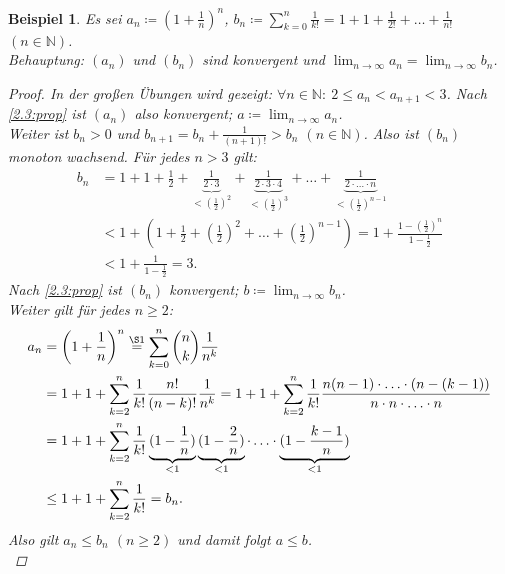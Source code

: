 \documentclass[12pt]{extreport} %
\newcommand{\N}{\mathbb{N}}
\theoremstyle{named}
\theoremstyle{itshape}
\theoremstyle{normal}
\newtheorem{beispiel}[unnamedtheorem]{Beispiel}
\begin{document}
\begin{beispiel} \label{2.9:bsp}
	Es sei $a_{n} \coloneqq \left( 1 + \frac{1}{n} \right)^{n}$, $b_{n} \coloneqq \sum_{k = 0}^{n} \frac{1}{k!} = 1 + 1 + \frac{1}{2!} + \dotsc + \frac{1}{n!}$ $(n \in \N)$.\\
	Behauptung: $(a_{n})$ und $(b_{n})$ sind konvergent und $\lim_{n \to \infty} a_{n} = \lim_{n \to \infty}  b_{n}$.
	
	\begin{proof}
		In der großen Übungen wird gezeigt: $\forall n \in \N: ~ 2 \leq a_{n} < a_{n+1} < 3$. Nach \ref{2.3:prop} ist $(a_n)$ also konvergent; 
		$a \coloneqq \lim_{n \to \infty} a_{n}$. \\
		Weiter ist $b_{n} > 0$ und $b_{n+1} = b_{n} + \frac{1}{(n+1)!} > b_{n}$ $(n \in \N)$. Also ist $(b_{n})$ monoton wachsend. Für jedes $n > 3$ gilt:
		\begin{align*} 
			b_{n} & = 1 + 1 + \frac{1}{2} + \underbrace{\frac{1}{2 \cdot 3}}_{< \left(\frac{1}{2}\right)^{2}} + \underbrace{\frac{1}{2 \cdot 3 \cdot 4}}_{< 
			\left(\frac{1}{2}\right)^{3}} + \dotsc + \underbrace{\frac{1}{2 \cdot \dotsc \cdot n}}_{< \left(\frac{1}{2}\right)^{n-1}} \\
			& < 1 + \left( 1 + \frac{1}{2} + \left(\frac{1}{2}\right)^{2} + \dotsc + \left(\frac{1}{2}\right)^{n-1} \right) 
			= 1 + \frac{1 - \left( \frac{1}{2} \right)^{n}}{1 - \frac{1}{2}} \\
			& < 1 + \frac{1}{1 - \frac{1}{2}} = 3.
		\end{align*} 
		Nach \ref{2.3:prop} ist $(b_{n})$ konvergent; $b \coloneqq \lim_{n \to \infty} b_{n}$. \\
		Weiter gilt für jedes $n \geq 2$:
		\begin{align*}
			a_{n} & = \left( 1 + \frac{1}{n} \right)^{n} \overset{\S 1}{=} \sum_{k=0}^{n} \binom{n}{k} \frac{1}{n^{k}} \\
				  & = 1 + 1 + \sum_{k = 2}^{n} \frac{1}{k!} \frac{n!}{(n-k)!} \frac{1}{n^{k}} 
				  = 1 + 1 + \sum_{k=2}^{n} \frac{1}{k!} \frac{n(n-1) \cdot \dotsc \cdot (n-(k-1))}{n \cdot n \cdot \dotsc \cdot n} \\
				  & = 1 + 1 + \sum_{k=2}^{n} \frac{1}{k!} \underbrace{(1 - \frac{1}{n})}_{< 1} \underbrace{(1 - \frac{2}{n})}_{< 1} \cdot \dotsc \cdot 
				  \underbrace{(1 - \frac{k-1}{n})}_{< 1} \\
				  & \leq 1 + 1 + \sum_{k=2}^{n} \frac{1}{k!} = b_{n}.
		\end{align*}
		Also gilt $a_{n} \leq b_{n}$ $(n \geq 2)$ und damit folgt $a \leq b$. \\

\end{proof}
\end{beispiel}
\end{document}
